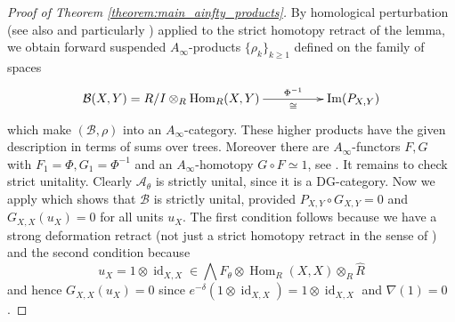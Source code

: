 \documentclass[english,letter paper,12pt,leqno]{article}
\theoremstyle{example}
\numberwithin{equation}{section}
\def\AA{\mathcal{A}}
\def\BB{\mathcal{B}}
\def\Hom{\operatorname{Hom}}
\begin{document}
\begin{proof}[Proof of Theorem \ref{theorem:main_ainfty_products}] 
By homological perturbation \cite[\S 3.3, p.33]{lazaroiu} (see also \cite[\S I]{seidel} and particularly \cite[Remark 1.15]{seidel}) applied to the strict homotopy retract of the lemma, we obtain forward suspended $A_\infty$-products $\{ \rho_k \}_{k \ge 1}$ defined on the family of spaces
\[
\xymatrix@C+2pc{
\BB(X,Y) = R/I \otimes_R \Hom_R(X,Y) \ar[r]_-{\cong}^-{\Phi^{-1}} & \operatorname{Im}(P_{X,Y})
}
\]
which make $(\BB, \rho)$ into an $A_\infty$-category. These higher products have the given description in terms of sums over trees. Moreover there are $A_\infty$-functors $F,G$ with $F_1 = \Phi, G_1 = \Phi^{-1}$ and an $A_\infty$-homotopy $G \circ F \simeq 1$, see \cite{markl_transfer}. It remains to check strict unitality. Clearly $\AA_{\theta}$ is strictly unital, since it is a DG-category. Now we apply \cite[p.37]{lazaroiu} which shows that $\BB$ is strictly unital, provided $P_{X,Y} \circ G_{X,Y} = 0$ and $G_{X,X}(u_X) = 0$ for all units $u_X$. The first condition follows because we have a strong deformation retract (not just a strict homotopy retract in the sense of \cite{lazaroiu}) and the second condition because
\[
u_X = 1 \otimes \operatorname{id}_{X,X} \in \bigwedge F_\theta \otimes \Hom_R(X,X) \otimes_R \widehat{R}
\]
and hence $G_{X,X}(u_X) = 0$ since $e^{-\delta}(1 \otimes \operatorname{id}_{X,X}) = 1 \otimes \operatorname{id}_{X,X}$ and $\nabla(1) = 0$.
\end{proof}%
\end{document}

